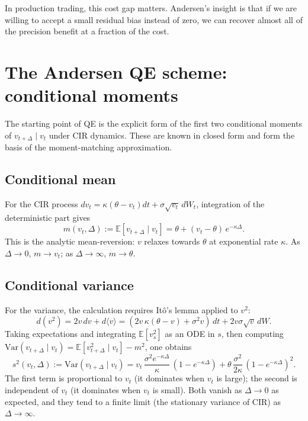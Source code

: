 \documentclass[11pt]{article}
\theoremstyle{plain}
\theoremstyle{definition}
\theoremstyle{remark}
\begin{document}
In production trading, this cost gap matters. Andersen's insight is that if we are willing to accept a small residual bias instead of zero, we can recover almost all of the precision benefit at a fraction of the cost.

\section{The Andersen QE scheme: conditional moments}

The starting point of QE is the explicit form of the first two conditional moments of $v_{t+\Delta} \mid v_t$ under CIR dynamics. These are known in closed form and form the basis of the moment-matching approximation.

\subsection{Conditional mean}

For the CIR process $dv_t = \kappa(\theta - v_t)dt + \sigma\sqrt{v_t}\,dW_t$, integration of the deterministic part gives
\begin{equation}
    m(v_t, \Delta) := \mathbb{E}[v_{t+\Delta} \mid v_t] = \theta + (v_t - \theta)\, e^{-\kappa\Delta}.                           \label{eq:cond-mean}
\end{equation}
This is the analytic mean-reversion: $v$ relaxes towards $\theta$ at exponential rate $\kappa$. As $\Delta \to 0$, $m \to v_t$; as $\Delta \to \infty$, $m \to \theta$.

\subsection{Conditional variance}

For the variance, the calculation requires Itô's lemma applied to $v^2$:
\[
    d(v^2) = 2 v\, dv + d\langle v \rangle = (2 v\, \kappa(\theta - v) + \sigma^2 v)\,dt + 2 v \sigma\sqrt{v}\,dW.
\]
Taking expectations and integrating $\mathbb{E}[v_s^2]$ as an ODE in $s$, then computing $\mathrm{Var}(v_{t+\Delta} \mid v_t) = \mathbb{E}[v_{t+\Delta}^2 \mid v_t] - m^2$, one obtains
\begin{equation}
    s^2(v_t, \Delta) := \mathrm{Var}(v_{t+\Delta} \mid v_t) = v_t\, \frac{\sigma^2 e^{-\kappa\Delta}}{\kappa}\,(1 - e^{-\kappa\Delta}) + \theta\, \frac{\sigma^2}{2\kappa}\,(1 - e^{-\kappa\Delta})^2.                                          \label{eq:cond-var}
\end{equation}
The first term is proportional to $v_t$ (it dominates when $v_t$ is large); the second is independent of $v_t$ (it dominates when $v_t$ is small). Both vanish as $\Delta \to 0$ as expected, and they tend to a finite limit (the stationary variance of CIR) as $\Delta \to \infty$.
\end{document}
